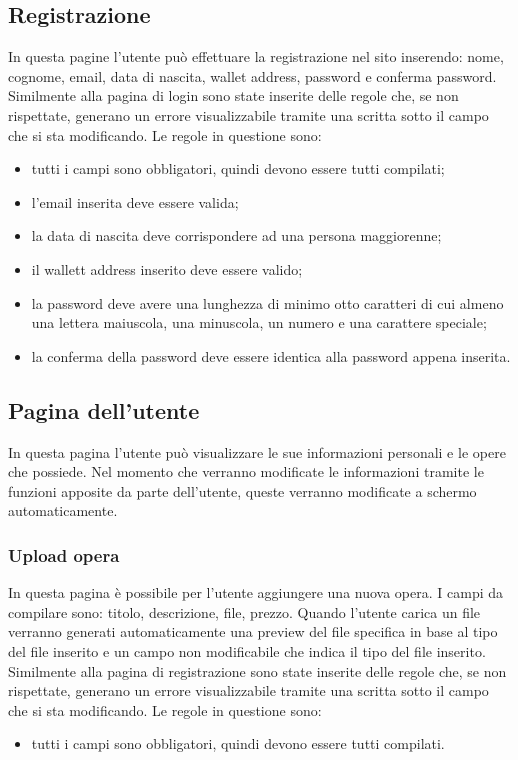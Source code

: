 \subsection{Registrazione}
In questa pagine l'utente può effettuare la registrazione nel sito inserendo: nome, cognome, email, data di nascita, wallet address, password e conferma password. Similmente alla pagina di login sono state inserite delle regole che, se non rispettate, generano un errore visualizzabile tramite una scritta sotto il campo che si sta modificando. Le regole in questione sono:
\begin{itemize}
	\item tutti i campi sono obbligatori, quindi devono essere tutti compilati;
	\item l'email inserita deve essere valida;
	\item la data di nascita deve corrispondere ad una persona maggiorenne;
	\item il wallett address inserito deve essere valido;
	\item la password deve avere una lunghezza di minimo otto caratteri di cui almeno una lettera maiuscola, una minuscola, un numero e una carattere speciale;
	\item la conferma della password deve essere identica alla password appena inserita.
\end{itemize}
\subsection{Pagina dell'utente}
In questa pagina l'utente può visualizzare le sue informazioni personali e le opere che possiede. Nel momento che verranno modificate le informazioni tramite le funzioni apposite da parte dell'utente, queste verranno modificate a schermo automaticamente.
\subsubsection{Upload opera}
In questa pagina è possibile per l'utente aggiungere una nuova opera. I campi da compilare sono: titolo, descrizione, file, prezzo. Quando l'utente carica un file verranno generati automaticamente una preview del file specifica in base al tipo del file inserito e un campo non modificabile che indica il tipo del file inserito. Similmente alla pagina di registrazione sono state inserite delle regole che, se non rispettate, generano un errore visualizzabile tramite una scritta sotto il campo che si sta modificando. Le regole in questione sono:
\begin{itemize}
	\item tutti i campi sono obbligatori, quindi devono essere tutti compilati.
\end{itemize}
